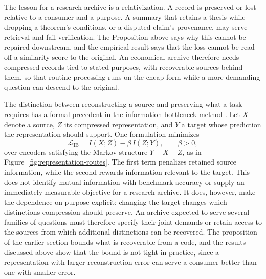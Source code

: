\documentclass[11pt]{article}
\theoremstyle{remark}
\begin{document}
The lesson for a research archive is a relativization. A record is preserved or lost relative to a consumer and a purpose. A summary that retains a thesis while dropping a theorem's conditions, or a disputed claim's provenance, may serve retrieval and fail verification. The Proposition above says why this cannot be repaired downstream, and the empirical result says that the loss cannot be read off a similarity score to the original. An economical archive therefore needs compressed records tied to stated purposes, with recoverable sources behind them, so that routine processing runs on the cheap form while a more demanding question can descend to the original.

The distinction between reconstructing a source and preserving what a task requires has a formal precedent in the information bottleneck method \cite{tishby1999}. Let $X$ denote a source, $Z$ its compressed representation, and $Y$ a target whose prediction the representation should support. One formulation minimizes
\begin{equation}
\mathcal{L}_{\mathrm{IB}} = I(X;Z) - \beta\, I(Z;Y), \qquad \beta > 0,
\end{equation}
over encoders satisfying the Markov structure $Y - X - Z$, as in Figure~\ref{fig:representation-routes}. The first term penalizes retained source information, while the second rewards information relevant to the target. This does not identify mutual information with benchmark accuracy or supply an immediately measurable objective for a research archive. It does, however, make the dependence on purpose explicit: changing the target changes which distinctions compression should preserve. An archive expected to serve several families of questions must therefore specify their joint demands or retain access to the sources from which additional distinctions can be recovered. The proposition of the earlier section bounds what is recoverable from a code, and the results discussed above show that the bound is not tight in practice, since a representation with larger reconstruction error can serve a consumer better than one with smaller error.
\end{document}
